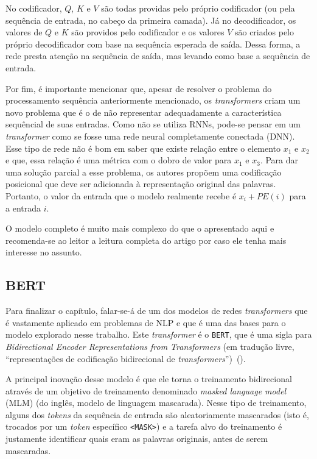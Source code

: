 No codificador, $Q$, $K$ e $V$ são todas providas pelo próprio codificador (ou
pela sequência de entrada, no cabeço da primeira camada). Já no decodificador,
os valores de $Q$ e $K$ são providos pelo codificador e os valores $V$ são
criados pelo próprio decodificador com base na sequência esperada de saída.
Dessa forma, a rede presta atenção na sequência de saída, mas levando como base
a sequência de entrada.

Por fim, é importante mencionar que, apesar de resolver o problema do
processamento sequência anteriormente mencionado, os \textit{transformers} criam
um novo problema que é o de não representar adequadamente a característica
sequêncial de suas entradas. Como não se utiliza RNNs, pode-se pensar em um
\textit{transformer} como se fosse uma rede neural completamente conectada
(DNN). Esse tipo de rede não é bom em saber que existe relação entre o elemento
$x_1$ e $x_2$ e que, essa relação é uma métrica com o dobro de valor para $x_1$
e $x_3$. Para dar uma solução parcial a esse problema, os autores propõem uma
codificação posicional que deve ser adicionada à representação original das
palavras. Portanto, o valor da entrada que o modelo realmente recebe é
$x_i+PE(i)$ para a entrada $i$.

O modelo completo é muito mais complexo do que o apresentado aqui e recomenda-se
ao leitor a leitura completa do artigo por
\cite{vaswani-etal:2017:attention-is-all-you-need} caso ele tenha mais interesse
no assunto.

\subsection{BERT}%
\label{sub:bert}

Para finalizar o capítulo, falar-se-á de um dos modelos de redes
\textit{transformers} que é vastamente aplicado em problemas de NLP e que é uma
das bases para o modelo explorado nesse trabalho. Este \textit{transformer} é o
\texttt{BERT}, que é uma sigla para \textit{Bidirectional Encoder
Representations from Transformers} (em tradução livre, ``representações de
codificação bidirecional de
\textit{transformers}'')~(\cite{devlin-etal:2018:bert}).

A principal inovação desse modelo é que ele torna o treinamento bidirecional
através de um objetivo de treinamento denominado \textit{masked language model}
(MLM) (do inglês, modelo de linguagem mascarada). Nesse tipo de treinamento,
alguns dos \textit{tokens} da sequência de entrada são aleatoriamente
mascarados (isto é, trocados por um \textit{token} específico \texttt{<MASK>}) e
a tarefa alvo do treinamento é justamente identificar quais eram as palavras
originais, antes de serem mascaradas.

